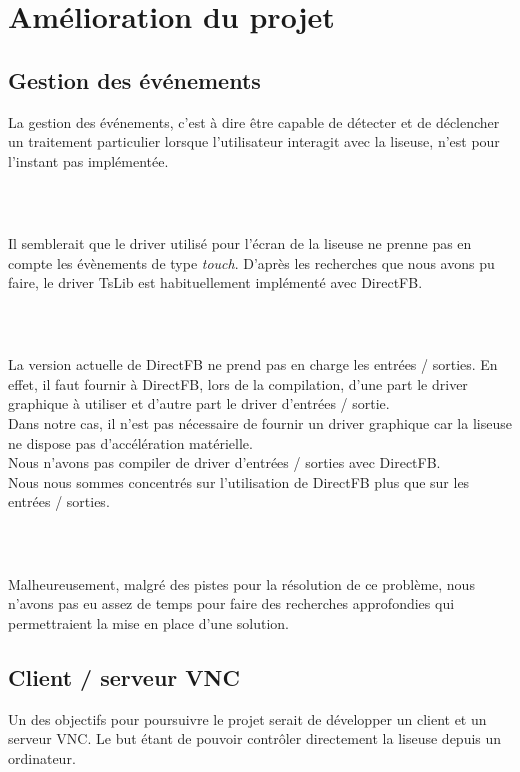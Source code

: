 \chapter{Amélioration du projet}


\section{Gestion des événements}
La gestion des événements, c'est à dire être capable de détecter et de déclencher un traitement particulier lorsque l'utilisateur interagit avec la liseuse, n'est pour l'instant pas implémentée.
\paragraph*{~}
Il semblerait que le driver utilisé pour l'écran de la liseuse ne prenne pas en compte les évènements de type \emph{touch}. D'après les recherches que nous avons pu faire, le driver TsLib est habituellement implémenté avec DirectFB.
\paragraph*{~}
La version actuelle de DirectFB ne prend pas en charge les entrées / sorties. En effet, il faut fournir à DirectFB, lors de la compilation, d'une part le driver graphique à utiliser et d'autre part le driver d'entrées / sortie.\\Dans notre cas, il n'est pas nécessaire de fournir un driver graphique car la liseuse ne dispose pas d'accélération matérielle.\\Nous n'avons pas compiler de driver d'entrées / sorties avec DirectFB.\\Nous nous sommes concentrés sur l'utilisation de DirectFB plus que sur les entrées / sorties.
\paragraph*{~}
Malheureusement, malgré des pistes pour la résolution de ce problème, nous n'avons pas eu assez de temps pour faire des recherches approfondies qui permettraient la mise en place d'une solution.


\section{Client / serveur VNC}

Un des objectifs pour poursuivre le projet serait de développer un client et un serveur VNC. Le but étant de pouvoir contrôler directement la liseuse depuis un ordinateur.

